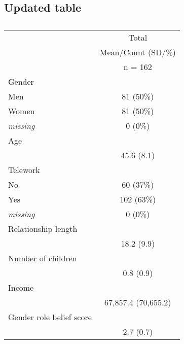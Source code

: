 \documentclass[
  english,
  man]{apa6}
\begin{document}
\hypertarget{updated-table}{%
\subsection{Updated table}\label{updated-table}}

\begin{table}[ ht ] 
\centering 
\caption{}\label{}
\begin{tabular}{ l c }
\toprule
 &   \multicolumn{ 1 }{c}{ Total }\\ 
  & Mean/Count (SD/\%) \\ 
 & n = 162 \\ 
 \midrule
Gender &  \\ 
\hspace{6pt}    Men & 81 (50\%)\\ 
\hspace{6pt}    Women & 81 (50\%)\\ 
\hspace{6pt}    \emph{missing} & 0 (0\%)\\ 
Age &  \\ 
\hspace{6pt}   & 45.6 (8.1)\\ 
Telework &  \\ 
\hspace{6pt}    No & 60 (37\%)\\ 
\hspace{6pt}    Yes & 102 (63\%)\\ 
\hspace{6pt}    \emph{missing} & 0 (0\%)\\ 
Relationship length &  \\ 
\hspace{6pt}   & 18.2 (9.9)\\ 
Number of children &  \\ 
\hspace{6pt}   & 0.8 (0.9)\\ 
Income &  \\ 
\hspace{6pt}   & 67,857.4 (70,655.2)\\ 
Gender role belief score &  \\ 
\hspace{6pt}   & 2.7 (0.7)\\ 
\bottomrule

\end{tabular}
\end{table}
\end{document}
